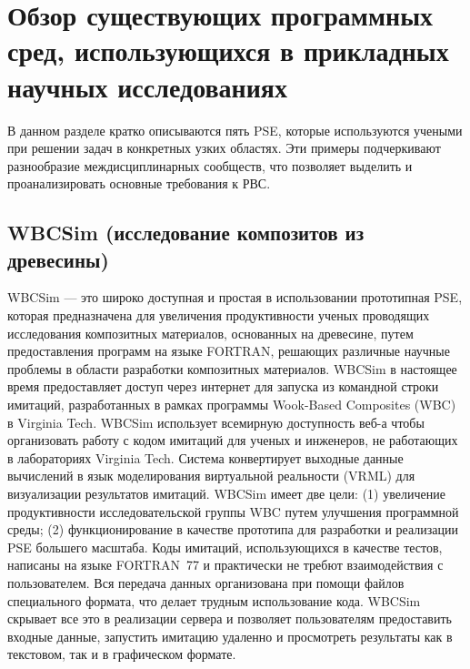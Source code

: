 \section{Обзор существующих программных сред, использующихся в прикладных научных исследованиях} 
\label{review}

В данном разделе кратко описываются пять PSE, которые используются учеными при решении задач в конкретных узких областях. Эти примеры подчеркивают разнообразие междисциплинарных сообществ, что позволяет выделить и проанализировать основные требования к РВС.

\subsection{WBCSim (исследование композитов из древесины)}

WBCSim --- это широко доступная и простая в использовании прототипная PSE, которая предназначена для увеличения продуктивности ученых проводящих исследования композитных материалов, основанных на древесине, путем предоставления программ на языке FORTRAN, решающих различные научные проблемы в области разработки композитных материалов. WBCSim в настоящее время предоставляет доступ через интернет для запуска из командной строки имитаций, разработанных в рамках программы Wook-Based Composites (WBC) в Virginia Tech. WBCSim использует всемирную доступность веб-а чтобы организовать работу с кодом имитаций для ученых и инженеров, не работающих в лабораториях Virginia Tech. Система конвертирует выходные данные вычислений в язык моделирования виртуальной реальности (VRML) для визуализации результатов имитаций. WBCSim имеет две цели: (1) увеличение продуктивности исследовательской группы WBC путем улучшения программной среды; (2) функционирование в качестве прототипа для разработки и реализации PSE большего масштаба. Коды имитаций, использующихся в качестве тестов, написаны на языке FORTRAN~77 и практически не требют взаимодействия с пользователем. Вся передача данных организована при помощи файлов специального формата, что делает трудным использование кода. WBCSim скрывает все это в реализации сервера и позволяет пользователям предоставить входные данные, запустить имитацию удаленно и просмотреть результаты как в текстовом, так и в графическом формате.

